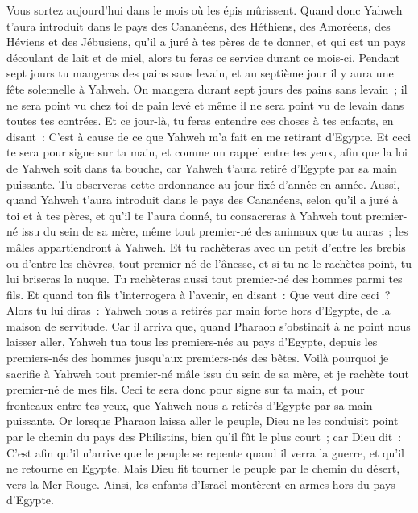 \begin{multicols}{2}
Vous sortez aujourd'hui dans le mois où les épis mûrissent.
Quand donc Yahweh t'aura introduit dans le pays des Cananéens, des Héthiens, des Amoréens, des Héviens et des Jébusiens, qu'il a juré à tes pères de te donner, et qui est un pays découlant de lait et de miel, alors tu feras ce service durant ce mois-ci.
Pendant sept jours tu mangeras des pains sans levain, et au septième jour il y aura une fête solennelle à Yahweh.
On mangera durant sept jours des pains sans levain~; il ne sera point vu chez toi de pain levé et même il ne sera point vu de levain dans toutes tes contrées.
Et ce jour-là, tu feras entendre ces choses à tes enfants, en disant~: C'est à cause de ce que Yahweh m'a fait en me retirant d'Egypte.
Et ceci te sera pour signe sur ta main, et comme un rappel entre tes yeux, afin que la loi de Yahweh soit dans ta bouche, car Yahweh t'aura retiré d'Egypte par sa main puissante.
Tu observeras cette ordonnance au jour fixé d'année en année.
Aussi, quand Yahweh t'aura introduit dans le pays des Cananéens, selon qu'il a juré à toi et à tes pères, et qu'il te l'aura donné,
tu consacreras à Yahweh tout premier-né issu du sein de sa mère, même tout premier-né des animaux que tu auras~; les mâles appartiendront à Yahweh.
Et tu rachèteras avec un petit d'entre les brebis ou d'entre les chèvres, tout premier-né de l'ânesse, et si tu ne le rachètes point, tu lui briseras la nuque. Tu rachèteras aussi tout premier-né des hommes parmi tes fils.
Et quand ton fils t'interrogera à l'avenir, en disant~: Que veut dire ceci~? Alors tu lui diras~: Yahweh nous a retirés par main forte hors d'Egypte, de la maison de servitude.
Car il arriva que, quand Pharaon s'obstinait à ne point nous laisser aller, Yahweh tua tous les premiers-nés au pays d'Egypte, depuis les premiers-nés des hommes jusqu'aux premiers-nés des bêtes. Voilà pourquoi je sacrifie à Yahweh tout premier-né mâle issu du sein de sa mère, et je rachète tout premier-né de mes fils.
Ceci te sera donc pour signe sur ta main, et pour fronteaux entre tes yeux, que Yahweh nous a retirés d'Egypte par sa main puissante.
Or lorsque Pharaon laissa aller le peuple, Dieu ne les conduisit point par le chemin du pays des Philistins, bien qu'il fût le plus court~; car Dieu dit~: C'est afin qu'il n'arrive que le peuple se repente quand il verra la guerre, et qu'il ne retourne en Egypte.
Mais Dieu fit tourner le peuple par le chemin du désert, vers la Mer Rouge. Ainsi, les enfants d'Israël montèrent en armes hors du pays d'Egypte.

\end{multicols}
